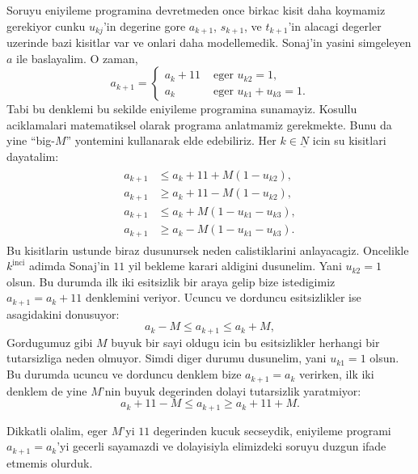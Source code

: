 Soruyu eniyileme programina devretmeden once birkac kisit daha koymamiz
gerekiyor cunku $u_{kj}$'in degerine gore $a_{k+1}$, $s_{k+1}$, ve $t_{k+1}$'in
alacagi degerler uzerinde bazi kisitlar var ve onlari daha modellemedik.
Sonaj'in yasini simgeleyen $a$ ile baslayalim. O zaman,
%
\begin{equation*}
    a_{k+1} = 
    \begin{cases}
        a_k + 11 & \mbox{ eger } u_{k2} = 1, \\
        a_k & \mbox{ eger } u_{k1} + u_{k3} = 1.
    \end{cases}
\end{equation*}
%
Tabi bu denklemi bu sekilde eniyileme programina sunamayiz. Kosullu aciklamalari
matematiksel olarak programa anlatmamiz gerekmekte. Bunu da yine ``big-$M$''
yontemini kullanarak elde edebiliriz. Her $k \in \underline{N}$ icin su
kisitlari dayatalim:
%
\begin{align}
    \begin{split}
    a_{k+1} &\leq a_k + 11 + M\left( 1 - u_{k2} \right), \\
    a_{k+1} &\geq a_k + 11 - M\left( 1 - u_{k2} \right), \\
    a_{k+1} &\leq a_k + M\left( 1 - u_{k1} - u_{k3} \right), \\
    a_{k+1} &\geq a_k - M\left( 1 - u_{k1} - u_{k3} \right).
    \end{split}
    \label{eq:a_constraints_big_M}
\end{align}
%
Bu kisitlarin ustunde biraz dusunursek neden calistiklarini anlayacagiz.
Oncelikle $k^{\text{inci}}$ adimda Sonaj'in $11$ yil bekleme karari aldigini
dusunelim. Yani $u_{k2} = 1$ olsun. Bu durumda ilk iki esitsizlik bir araya
gelip bize istedigimiz $a_{k+1} = a_k + 11$ denklemini veriyor. Ucuncu ve
dorduncu esitsizlikler ise asagidakini donusuyor: 
\[
    a_k - M \leq a_{k+1} \leq a_k + M, 
\]
%
Gordugumuz gibi $M$ buyuk bir sayi oldugu icin bu esitsizlikler herhangi bir
tutarsizliga neden olmuyor. Simdi diger durumu dusunelim, yani $u_{k1} = 1$
olsun. Bu durumda ucuncu ve dorduncu denklem bize $a_{k+1} = a_k$ verirken, ilk
iki denklem de yine $M$'nin buyuk degerinden dolayi tutarsizlik yaratmiyor: 
\[ a_k + 11 - M \leq a_{k+1} \geq a_k + 11 + M. \]
%
\begin{rem}
    Dikkatli olalim, eger $M$'yi $11$ degerinden kucuk secseydik, eniyileme
    programi $a_{k+1} = a_k$'yi gecerli sayamazdi ve dolayisiyla elimizdeki
    soruyu duzgun ifade etmemis olurduk.
\end{rem}

